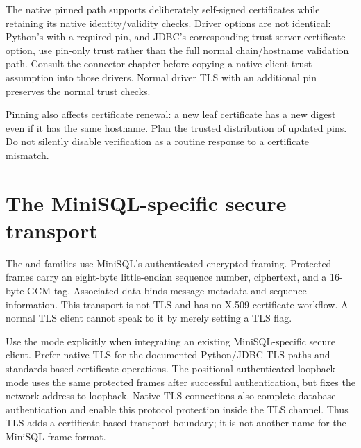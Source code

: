 The native pinned path supports deliberately self-signed certificates while
retaining its native identity/validity checks. Driver options are not
identical: Python's  with a required
pin, and JDBC's corresponding trust-server-certificate option, use pin-only
trust rather than the full normal chain/hostname validation path. Consult the
connector chapter before copying a native-client trust assumption into those
drivers. Normal driver TLS with an additional pin preserves the normal trust
checks.

Pinning also affects certificate renewal: a new leaf certificate has a new
digest even if it has the same hostname. Plan the trusted distribution of
updated pins. Do not silently disable verification as a routine response to
a certificate mismatch.


\section{The MiniSQL-specific secure transport}

The  and  families use MiniSQL's
authenticated encrypted framing. Protected frames carry an eight-byte
little-endian sequence number, ciphertext, and a 16-byte GCM tag. Associated
data binds message metadata and sequence information. This transport is not
TLS and has no X.509 certificate workflow. A normal TLS client cannot speak
to it by merely setting a TLS flag.

Use the mode explicitly when integrating an existing MiniSQL-specific secure
client. Prefer native TLS for the documented Python/JDBC TLS paths and
standards-based certificate operations. The positional authenticated loopback
mode uses the same protected frames after successful authentication, but fixes
the network address to loopback. Native TLS connections also complete database
authentication and enable this protocol protection inside the TLS channel.
Thus TLS adds a certificate-based transport boundary; it is not another name
for the MiniSQL frame format.


